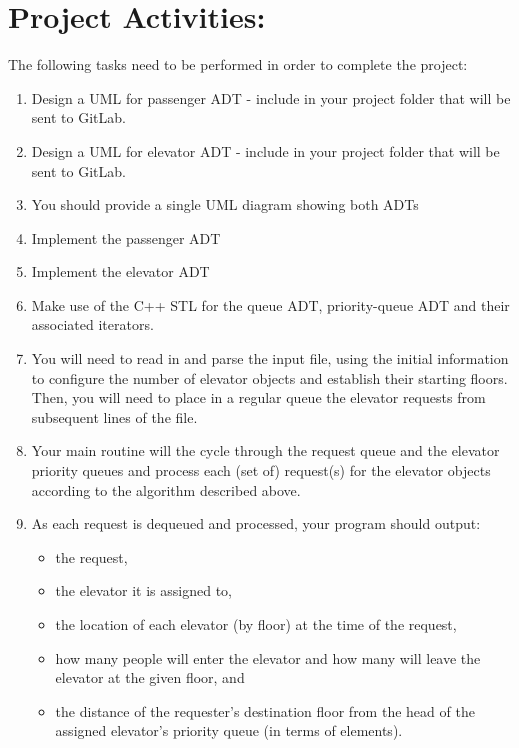 \documentclass[10pt]{article}
\begin{document}
\section*{Project Activities:}

The following tasks need to be performed in order to complete the project:

\newcommand{\tab}{\hspace{3em}}

\begin{enumerate}
	\item Design a UML for passenger ADT - include in your project folder that will be sent to GitLab.

	\item Design a UML for elevator ADT - include in your project folder that will be sent to GitLab.

	\item You should provide a single UML diagram showing both ADTs

	\item Implement the passenger ADT

	\item Implement the elevator ADT

	\item Make use of the C++ STL for the queue ADT, priority-queue ADT and their associated iterators.

	\item You will need to read in and parse the input file, using the initial information to configure the number of elevator objects and establish their starting floors. Then, you will need to place in a regular queue the elevator requests from subsequent lines of the file. 

	\item Your main routine will the cycle through the request queue and the elevator priority queues and process each (set of) request(s) for the elevator objects according to the algorithm described above. 

   \item As each request is dequeued and processed, your program should output:
   \begin{itemize}
      \item the request,
      \item the elevator it is assigned to,
      \item the location of each elevator (by floor) at the time of the request,
      \item how many people will enter the elevator and how many will leave the elevator at the given floor, and
      \item the distance of the requester's destination floor from the head of the assigned elevator's priority queue (in terms of elements). 
   \end{itemize}


\end{enumerate}
\end{document}
